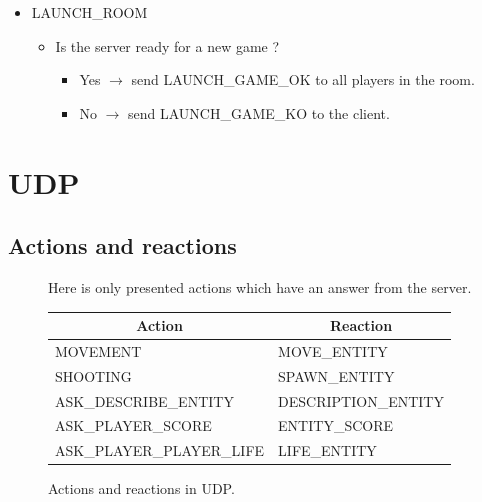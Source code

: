 \documentclass[a4 paper, 12pt]{report}
\begin{document}
\begin{itemize}
\item LAUNCH\_ROOM
  \begin{itemize}
    \item Is the server ready for a new game ?
      \begin{itemize}
        \item Yes $\rightarrow$ send LAUNCH\_GAME\_OK to all players in the room.
          \item No $\rightarrow$ send LAUNCH\_GAME\_KO to the client.
      \end{itemize}
  \end{itemize}


\end{itemize}

\newpage

\section{UDP}

\subsection{Actions and reactions}

\begin{figure}[!Hh]
  Here is only presented actions which have an answer from the server.\\

  \centering
  \begin{tabular}{|l|l|}
    \hline
    \multicolumn{1}{|c|}{\textbf{Action}} & \multicolumn{1}{c|}{\textbf{Reaction}}\\
    \hline
    \hline
    \multirow{2}{*}{MOVEMENT} & \multirow{2}{*}{MOVE\_ENTITY}\\
    & \\
    \hline
    \multirow{2}{*}{SHOOTING} & \multirow{2}{*}{SPAWN\_ENTITY}\\
    & \\
    \hline
    \multirow{2}{*}{ASK\_DESCRIBE\_ENTITY} & \multirow{2}{*}{DESCRIPTION\_ENTITY}\\
    & \\
    \hline
    \multirow{2}{*}{ASK\_PLAYER\_SCORE} & \multirow{2}{*}{ENTITY\_SCORE}\\
    & \\
    \hline
    \multirow{2}{*}{ASK\_PLAYER\_PLAYER\_LIFE} & \multirow{2}{*}{LIFE\_ENTITY}\\
    & \\
    \hline
  \end{tabular}
  \caption{Actions and reactions in UDP.}
\end{figure}
\end{document}

